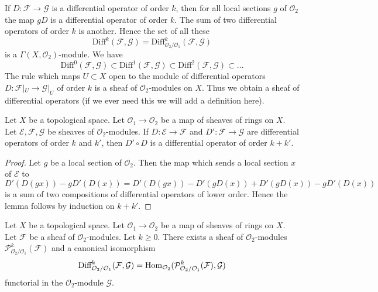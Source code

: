 \noindent
If $D : \mathcal{F} \to \mathcal{G}$ is a differential operator of order $k$,
then for all local sections $g$ of $\mathcal{O}_2$ the map $gD$ is a
differential operator of order $k$. The sum of two differential operators of
order $k$ is another. Hence the set of all these
$$
\text{Diff}^k(\mathcal{F}, \mathcal{G}) =
\text{Diff}^k_{\mathcal{O}_2/\mathcal{O}_1}(\mathcal{F}, \mathcal{G})
$$
is a $\Gamma(X, \mathcal{O}_2)$-module. We have
$$
\text{Diff}^0(\mathcal{F}, \mathcal{G}) \subset
\text{Diff}^1(\mathcal{F}, \mathcal{G}) \subset
\text{Diff}^2(\mathcal{F}, \mathcal{G}) \subset \ldots
$$
The rule which maps $U \subset X$ open to the module of
differential operators $D : \mathcal{F}|_U \to \mathcal{G}|_U$
of order $k$ is a sheaf of $\mathcal{O}_2$-modules on $X$.
Thus we obtain a sheaf of differential operators (if we ever need this we will
add a definition here).

\begin{lemma}
\label{lemma-composition-differential-operators}
Let $X$ be a topological space.
Let $\mathcal{O}_1 \to \mathcal{O}_2$ be a map of sheaves of rings on $X$.
Let $\mathcal{E}, \mathcal{F}, \mathcal{G}$ be sheaves of
$\mathcal{O}_2$-modules.
If $D : \mathcal{E} \to \mathcal{F}$ and $D' : \mathcal{F} \to \mathcal{G}$
are differential operators of order $k$ and $k'$, then $D' \circ D$ is a
differential operator of order $k + k'$.
\end{lemma}

\begin{proof}
Let $g$ be a local section of $\mathcal{O}_2$.
Then the map which sends a local section $x$ of $\mathcal{E}$ to
$$
D'(D(gx)) - gD'(D(x)) = D'(D(gx)) - D'(gD(x)) + D'(gD(x)) - gD'(D(x))
$$
is a sum of two compositions of differential operators of lower order.
Hence the lemma follows by induction on $k + k'$.
\end{proof}

\begin{lemma}
\label{lemma-module-principal-parts}
Let $X$ be a topological space.
Let $\mathcal{O}_1 \to \mathcal{O}_2$ be a map of sheaves of rings on $X$.
Let $\mathcal{F}$ be a sheaf of $\mathcal{O}_2$-modules.
Let $k \geq 0$. There exists a sheaf of $\mathcal{O}_2$-modules
$\mathcal{P}^k_{\mathcal{O}_2/\mathcal{O}_1}(\mathcal{F})$
and a canonical isomorphism
$$
\text{Diff}^k_{\mathcal{O}_2/\mathcal{O}_1}(\mathcal{F}, \mathcal{G}) =
\mathop{\mathrm{Hom}}\nolimits_{\mathcal{O}_2}(
\mathcal{P}^k_{\mathcal{O}_2/\mathcal{O}_1}(\mathcal{F}), \mathcal{G})
$$
functorial in the $\mathcal{O}_2$-module $\mathcal{G}$.
\end{lemma}


